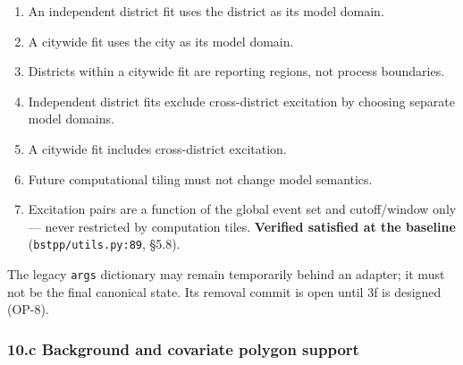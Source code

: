 \documentclass[
  10pt,
]{article}
\providecommand{\tightlist}{%
  \setlength{\itemsep}{0pt}\setlength{\parskip}{0pt}}
\begin{document}
\begin{enumerate}
\def\labelenumi{\arabic{enumi}.}
\tightlist
\item
  An independent district fit uses the district as its model domain.
\item
  A citywide fit uses the city as its model domain.
\item
  Districts within a citywide fit are reporting regions, not process boundaries.
\item
  Independent district fits exclude cross-district excitation by choosing separate model domains.
\item
  A citywide fit includes cross-district excitation.
\item
  Future computational tiling must not change model semantics.
\item
  Excitation pairs are a function of the global event set and cutoff/window only --- never restricted by computation tiles. \textbf{Verified satisfied at the baseline} (\texttt{bstpp/utils.py:89}, §5.8).
\end{enumerate}

The legacy \texttt{args} dictionary may remain temporarily behind an adapter; it must not be the final canonical state. Its removal commit is open until 3f is designed (OP-8).

\hypertarget{c-background-and-covariate-polygon-support}{%
\subsubsection{10.c Background and covariate polygon support}\label{c-background-and-covariate-polygon-support}}
\end{document}

